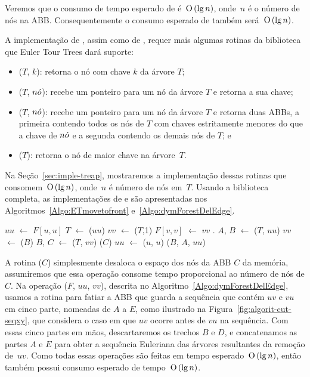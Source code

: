 Veremos que o consumo de tempo esperado de \ETmovetofront{} é~$\text{O}\left(\lg n\right)$, onde~$n$ é o número de nós na ABB. Consequentemente o consumo esperado de \dymForestAddEdge{} também será~$\text{O}\left(\lg n\right)$.

A implementação de \ETmovetofront{}, assim como de \dymForestDelEdge{}, requer mais algumas rotinas da biblioteca que Euler Tour Trees dará suporte:

\begin{itemize}
\item \treapSearch($T$, $k$): retorna o nó com chave $k$ da árvore $T$;
\item \treapOrder($T$, $n\acute{o}$): recebe um ponteiro para um nó da árvore $T$ e retorna a sua chave;
\item \treapSplit($T$, $n\acute{o}$): recebe um ponteiro para um nó da árvore $T$ e retorna duas ABBs, a primeira contendo todos os nós de $T$ com chaves estritamente menores do que a chave de $n\acute{o}$ e a segunda contendo os demais nós de $T$; e
\item \treapGetLast($T$): retorna o nó de maior chave na árvore~$T$.
\end{itemize}

Na Seção~\ref{sec:imple-treap}, mostraremos a implementação dessas rotinas que consomem~$\text{O}\left(\lg n\right)$, onde~$n$ é número de nós em~$T$. Usando a biblioteca completa, as implementações de \ETmovetofront{} e \dymForestDelEdge{} são apresentadas nos Algoritmos~\ref{Algo:ETmovetofront} e~\ref{Algo:dymForestDelEdge}.

\begin{algorithm}[htb]
\caption{\ETmovetofront($F$, $u$)}
\label{Algo:ETmovetofront}
\begin{algorithmic}[1]
\State $uu$ $\gets$ $F[u,u]$
\State $T$ $\gets$ \treapGetRoot($uu$)
\State $vv$ $\gets$ \treapSearch($T$,1)
 
\State $F[v,v]$ $\gets$ $vv$ .
\State $A$, $B$ $\gets$ \treapSplit($T$, $uu$)
\State $vv$ $\gets$ \treapGetLast($B$)
\State $B$, $C$ $\gets$ \treapSplit($T$, $vv$)
\State \free($C$)
\State $uu$ $\gets$ \treapCreate($u$, $u$)
\State \treapJoin($B$, $A$, $uu$)
\EndIf
\end{algorithmic}
\end{algorithm}

A rotina \free($C$) simplesmente desaloca o espaço dos nós da ABB $C$ da memória, assumiremos que essa operação consome tempo proporcional ao número de nós de $C$. Na operação \dymForestDelEdge($F$, $uu$, $vv$), descrita no Algoritmo~\ref{Algo:dymForestDelEdge}, usamos a rotina \treapSplit{} para fatiar a ABB que guarda a sequência que contém $uv$ e $vu$ em cinco parte, nomeadas de $A$ a $E$, como ilustrado na Figura~\ref{fig:algorit-cut-seqxy}, que considera o caso em que $uv$ ocorre antes de $vu$ na sequência. Com essas cinco partes em mãos, descartaremos os trechos $B$ e $D$, e concatenamos as partes $A$ e $E$ para obter a sequência Euleriana das árvores resultantes da remoção de~$uv$. Como todas essas operações são feitas em tempo esperado~$\text{O}\left(\lg n\right)$, então \dymForestDelEdge{} também possui consumo esperado de tempo~$\text{O}\left(\lg n\right)$.

